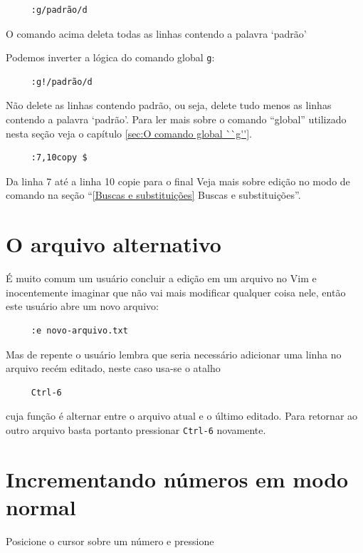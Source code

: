 \documentclass[10pt,a4paper,openany]{book}
\begin{document}
\begin{verbatim}
     :g/padrão/d
\end{verbatim}

O comando acima deleta todas as linhas contendo a palavra `padrão'

Podemos inverter a lógica do comando global \verb+g+:

\begin{verbatim}
     :g!/padrão/d
\end{verbatim}


Não delete as linhas contendo padrão, ou seja, delete tudo menos as linhas
contendo a palavra `padrão'. Para ler mais sobre o comando ``global'' utilizado 
nesta seção veja o capítulo \ref{sec:O comando global ``g''}.

\begin{verbatim}
     :7,10copy $
\end{verbatim}

Da linha 7 até a linha 10 copie para o final
Veja mais sobre edição no modo de comando na seção ``\ref{Buscas e
substituições} Buscas e substituições''.

\section{O arquivo alternativo}
\label{O arquivo alternativo}

É muito comum um usuário concluir a edição em um arquivo no Vim e
inocentemente imaginar que não vai mais modificar qualquer coisa nele, então
este usuário abre um novo arquivo:

\begin{verbatim}
     :e novo-arquivo.txt
\end{verbatim}

Mas de repente o usuário lembra que seria necessário adicionar uma linha no
arquivo recém editado, neste caso usa-se o atalho

\begin{verbatim}
     Ctrl-6
\end{verbatim}

cuja função é alternar entre o arquivo atual e o último editado. Para retornar
ao outro arquivo basta portanto pressionar \verb|Ctrl-6| novamente.

\section{Incrementando números em modo normal}\label{Incrementando números em modo normal}
Posicione o cursor sobre um número e pressione
\end{document}
